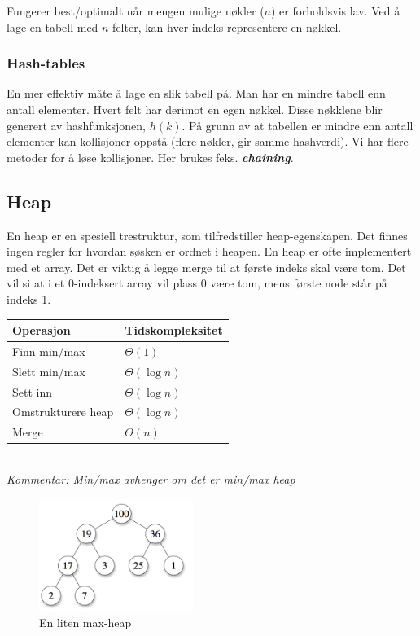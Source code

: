 \documentclass[a4paper, norsk,  10pt]{article}
\begin{document}
{{Fungerer best/optimalt når mengen mulige nøkler ($n$) er forholdsvis lav. Ved å lage en tabell med $n$ felter, kan hver indeks representere en nøkkel. 

\subsubsection{Hash-tables}

En mer effektiv måte å lage en slik tabell på. Man har en mindre tabell enn antall elementer. Hvert felt har derimot en egen nøkkel. Disse nøkklene blir generert av hashfunksjonen, $h(k)$. På grunn av at tabellen er mindre enn antall elementer kan kollisjoner oppstå (flere nøkler, gir samme hashverdi). Vi har flere metoder for å løse kollisjoner. Her brukes feks. \textbf{\textit{chaining}}.

\subsection{Heap}

En heap er en spesiell trestruktur, som tilfredstiller heap-egenskapen. 
Det finnes ingen regler for hvordan søsken er ordnet i heapen. 
En heap er ofte implementert med et array. Det er viktig å legge merge til at første indeks skal være tom. Det vil si at i et 0-indeksert array vil plass 0 være tom, mens første node står på indeks 1.

\begin{center}
\begin{tabular}{|l|l|}
        \hline
        Operasjon      & Tidskompleksitet \\ \hline
        Finn min/max   & $\Theta(1)$ \\ \hline
        Slett min/max & $\Theta(\log n)$ \\ \hline
        Sett inn         & $\Theta(\log n)$               \\ \hline
        Omstrukturere heap   & $\Theta(\log n)$              \\ \hline
        Merge          & $\Theta(n)$ \\ \hline
\end{tabular}\\
\textit{Kommentar: Min/max avhenger om det er min/max heap}
\end{center}

\begin{figure}[hbt]
    \begin{center}
        \includegraphics[width=5cm] {heap.png}
        \caption{En liten max-heap}
    \end{center}
\end{figure}

}}
\end{document}
